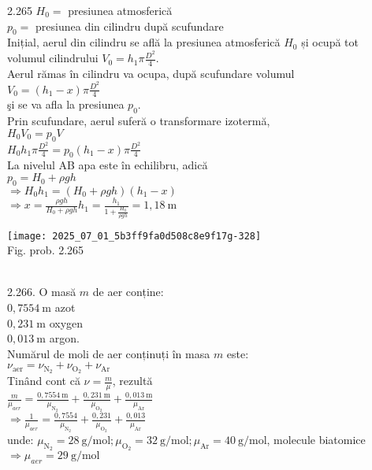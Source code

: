 2.265 $H_{0}=$ presiunea atmosferică\\ $p_{0}=$ presiunea din cilindru după scufundare\\ Inițial, aerul din cilindru se află la presiunea atmosferică $H_{0}$ și ocupă tot\\ volumul cilindrului $V_{0}=h_{1} \pi \frac{D^{2}}{4}$.\\ Aerul rămas în cilindru va ocupa, după scufundare volumul\\ $V_{0}=\left(h_{1}-x\right) \pi \frac{D^{2}}{4}$\\ şi se va afla la presiunea $p_{0}$.\\ Prin scufundare, aerul suferă o transformare izotermă,\\ $H_{0} V_{0}=p_{0} V$\\ $H_{0} h_{1} \pi \frac{D^{2}}{4}=p_{0}\left(h_{1}-x\right) \pi \frac{D^{2}}{4}$\\ La nivelul AB apa este în echilibru, adică\\ $p_{0}=H_{0}+\rho g h$\\ $\Rightarrow H_{0} h_{1}=\left(H_{0}+\rho g h\right)\left(h_{1}-x\right)$\\ $\Rightarrow x=\frac{\rho g h}{H_{0}+\rho g h} h_{1}=\frac{h_{1}}{1+\frac{H_{0}}{\rho g h}}=1,18 \mathrm{~m}$\\ \begin{center} \texttt{[image: 2025\_07\_01\_5b3ff9fa0d508c8e9f17g-328]}\\ Fig. prob. 2.265 \end{center}\\

2.266. O masă $m$ de aer conține:\\ $0,7554 \mathrm{~m}$ azot\\ $0,231 \mathrm{~m}$ oxygen\\ $0,013 \mathrm{~m}$ argon.\\ Numărul de moli de aer conținuți în masa $m$ este:\\ $\nu_{\text{aer}}=\nu_{\mathrm{N}_{2}}+\nu_{\mathrm{O}_{2}}+\nu_{\mathrm{Ar}}$\\ Tinând cont că $\nu=\frac{m}{\mu}$, rezultă\\ $\frac{m}{\mu_{a e r}}=\frac{0,7554 \mathrm{~m}}{\mu_{\mathrm{N}_{2}}}+\frac{0,231 \mathrm{~m}}{\mu_{\mathrm{O}_{2}}}+\frac{0,013 \mathrm{~m}}{\mu_{\mathrm{Ar}}}$\\ $\Rightarrow \frac{1}{\mu_{a e r}}=\frac{0,7554}{\mu_{\mathrm{N}_{2}}}+\frac{0,231}{\mu_{\mathrm{O}_{2}}}+\frac{0,013}{\mu_{\mathrm{Ar}}}$\\ unde: $\mu_{\mathrm{N}_{2}}=28 \mathrm{~g} / \mathrm{mol} ; \mu_{\mathrm{O}_{2}}=32 \mathrm{~g} / \mathrm{mol} ; \mu_{\mathrm{Ar}}=40 \mathrm{~g} / \mathrm{mol}$, molecule biatomice\\ $\Rightarrow \mu_{a e r}=29 \mathrm{~g} / \mathrm{mol}$\\ 

